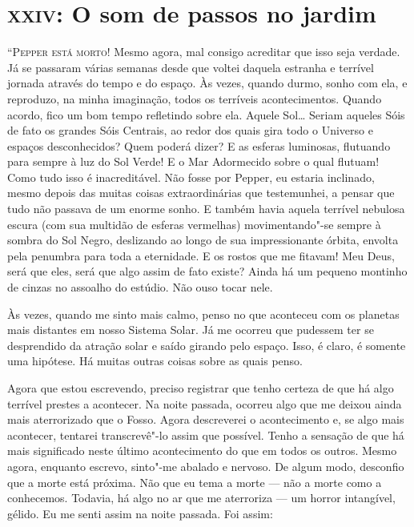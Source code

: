 \clearpage

\chapter{\textsc{xxiv}:  O som de passos no jardim}

\textsc{“Pepper está morto!} Mesmo agora, mal consigo acreditar que isso seja verdade. Já se passaram várias semanas desde
que voltei daquela estranha e terrível jornada através do tempo e do espaço. Às vezes, quando durmo, sonho com ela, e
reproduzo, na minha imaginação, todos os terríveis acontecimentos. Quando acordo, fico um bom tempo refletindo sobre
ela. Aquele Sol\ldots{} Seriam aqueles Sóis de fato os grandes Sóis Centrais, ao redor dos quais gira todo o Universo e
espaços desconhecidos? Quem poderá dizer? E as esferas luminosas, flutuando para sempre à luz do Sol Verde! E o Mar
Adormecido sobre o qual flutuam! Como tudo isso é inacreditável. Não fosse por Pepper, eu estaria inclinado, mesmo
depois das muitas coisas extraordinárias que testemunhei, a pensar que tudo não passava de um enorme sonho. E também
havia aquela terrível nebulosa escura (com sua multidão de esferas vermelhas) movimentando"-se sempre à sombra do Sol
Negro, deslizando ao longo de sua impressionante órbita, envolta pela penumbra para toda a eternidade. E os rostos que
me fitavam! Meu Deus, será que eles, será que algo assim de fato existe? Ainda há um pequeno montinho de cinzas no
assoalho do estúdio. Não ouso tocar nele.

Às vezes, quando me sinto mais calmo, penso no que aconteceu com os planetas mais distantes em nosso Sistema Solar. Já
me ocorreu que pudessem ter se desprendido da atração solar e saído girando pelo espaço. Isso, é claro, é somente uma
hipótese. Há muitas outras coisas sobre as quais penso.

Agora que estou escrevendo, preciso registrar que tenho certeza de que há algo terrível prestes a acontecer. Na noite
passada, ocorreu algo que me deixou ainda mais aterrorizado que o Fosso. Agora descreverei o acontecimento e, se
algo mais acontecer, tentarei transcrevê"-lo assim que possível. Tenho a sensação de que há mais significado neste
último acontecimento do que em todos os outros. Mesmo agora, enquanto escrevo, sinto"-me abalado e nervoso. De algum
modo, desconfio que a morte está próxima. Não que eu tema a morte --- não a morte como a conhecemos. Todavia, há algo no
ar que me aterroriza --- um horror intangível, gélido. Eu me senti assim na noite passada. Foi assim:

